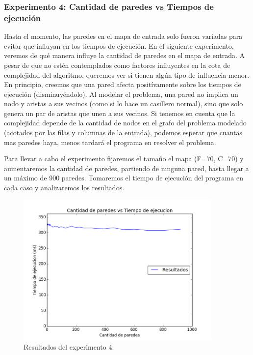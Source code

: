 \subsubsection{Experimento 4: Cantidad de paredes vs Tiempos de ejecución}

\par Hasta el momento, las paredes en el mapa de entrada solo fueron variadas para evitar que influyan en los tiempos de ejecución. En el siguiente experimento, veremos de qué manera influye la cantidad de paredes en el mapa de entrada. A pesar de que no estén contemplados como factores influyentes en la cota de complejidad del algoritmo, queremos ver si tienen algún tipo de influencia menor. En principio, creemos que una pared afecta positívamente sobre los tiempos de ejecución (disminuyéndolo). Al modelar el problema, una pared no implica un nodo y aristas a sus vecinos (como si lo hace un casillero normal), sino que solo genera un par de aristas que unen a sus vecinos. Si tenemos en cuenta que la complejidad depende de la cantidad de nodos en el grafo del problema modelado (acotados por las filas y columnas de la entrada), podemos esperar que cuantas mas paredes haya, menos tardará el programa en resolver el problema.

\par Para llevar a cabo el experimento fijaremos el tamaño el mapa (F=70, C=70) y aumentaremos la cantidad de paredes, partiendo de ninguna pared, hasta llegar a un máximo de 900 paredes. Tomaremos el tiempo de ejecución del programa en cada caso y analizaremos los resultados.

\begin{figure}[H]
  \centering
  \includegraphics[width=0.9\textwidth]{Problema2/img/exp4_paredes.png}
  \caption{Resultados del experimento 4.}
  \label{fig: ej2_exp4_paredes}
\end{figure}

